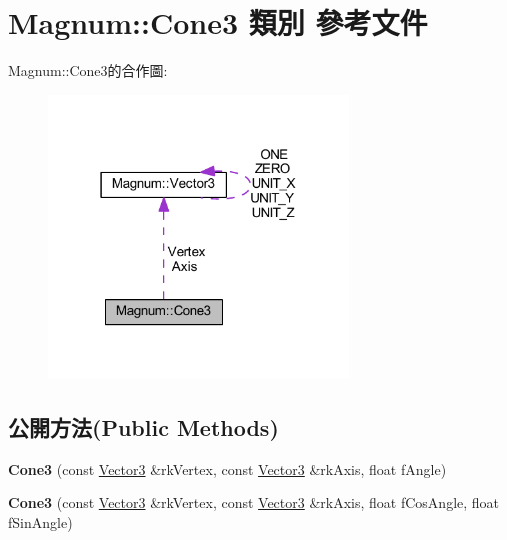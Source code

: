 \hypertarget{class_magnum_1_1_cone3}{}\section{Magnum\+:\+:Cone3 類別 參考文件}
\label{class_magnum_1_1_cone3}


Magnum\+:\+:Cone3的合作圖\+:\nopagebreak
\begin{figure}[H]
\begin{center}
\leavevmode
\includegraphics[width=226pt]{class_magnum_1_1_cone3__coll__graph}
\end{center}
\end{figure}
\subsection*{公開方法(Public Methods)}
\begin{DoxyCompactItemize}
\item 
{\bfseries Cone3} (const \hyperlink{class_magnum_1_1_vector3}{Vector3} \&rk\+Vertex, const \hyperlink{class_magnum_1_1_vector3}{Vector3} \&rk\+Axis, float f\+Angle)\hypertarget{class_magnum_1_1_cone3_a4b6edca85d4a658ba2698459362ad491}{}\label{class_magnum_1_1_cone3_a4b6edca85d4a658ba2698459362ad491}

\item 
{\bfseries Cone3} (const \hyperlink{class_magnum_1_1_vector3}{Vector3} \&rk\+Vertex, const \hyperlink{class_magnum_1_1_vector3}{Vector3} \&rk\+Axis, float f\+Cos\+Angle, float f\+Sin\+Angle)\hypertarget{class_magnum_1_1_cone3_a088079a2a4e21f45215d38e222ad44b3}{}\label{class_magnum_1_1_cone3_a088079a2a4e21f45215d38e222ad44b3}

\end{DoxyCompactItemize}
